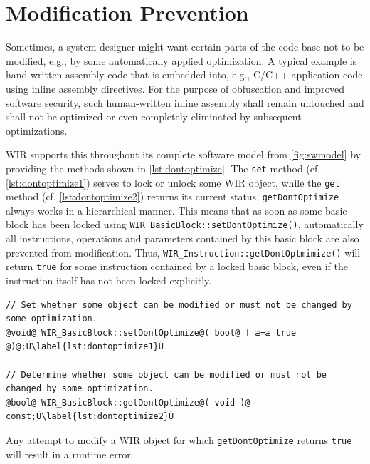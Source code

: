 \section{Modification Prevention}
\label{sec:dontoptimize}

Sometimes, a system designer might want certain parts of the code base not to be modified, e.g., by some automatically applied optimization.
A typical example is hand-written assembly code that is embedded into, e.g., C/C++ application code using inline assembly directives.
For the purpose of obfuscation and improved software security, such human-written inline assembly shall remain untouched and shall not be optimized or even completely eliminated by subsequent optimizations.

\gls{WIR} supports this throughout its complete software model from \cref{fig:swmodel} by providing the methods shown in \cref{lst:dontoptimize}.
The \texttt{set} method (cf. \cref{lst:dontoptimize1}) serves to lock or unlock some \gls{WIR} object, while the \texttt{get} method (cf. \cref{lst:dontoptimize2}) returns its current status.
\texttt{getDontOptimize} always works in a hierarchical manner.
This means that as soon as some basic block has been locked using \texttt{WIR\_BasicBlock::setDontOptimize()}, automatically all instructions, operations and parameters contained by this basic block are also prevented from modification.
Thus, \texttt{WIR\_Instruction::getDontOptmimize()} will return \texttt{true} for some instruction contained by a locked basic block, even if the instruction itself has not been locked explicitly.

\begin{lstlisting}[style=code,float=h,caption={Modification Prevention of WIR Objects},label=lst:dontoptimize]
// Set whether some object can be modified or must not be changed by some optimization.
@void@ WIR_BasicBlock::setDontOptimize@( bool@ f æ=æ true @)@;Ü\label{lst:dontoptimize1}Ü

// Determine whether some object can be modified or must not be changed by some optimization.
@bool@ WIR_BasicBlock::getDontOptimize@( void )@ const;Ü\label{lst:dontoptimize2}Ü
\end{lstlisting}

Any attempt to modify a \gls{WIR} object for which \texttt{getDontOptimize} returns \texttt{true} will result in a runtime error.



